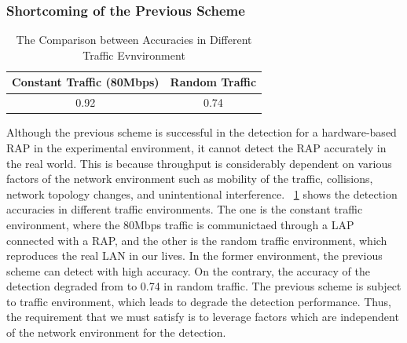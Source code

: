 \documentclass[conference]{IEEEtran}
\begin{document}
\subsubsection{Shortcoming of the Previous Scheme}\label{sec:shortcoming}
\begin{table}[t] 
    \begin{center}
        \caption{The Comparison between Accuracies in Different Traffic Evnvironment}
        \label{tab:thrput result}
        \begin{tabular}{c c} \hline
            Constant Traffic (80Mbps) & Random Traffic \\ \hline \hline
            0.92 & 0.74 \\ \hline
        \end{tabular}
    \end{center}
    \vspace{-2zh}
\end{table}
Although the previous scheme is successful in the detection for a hardware-based RAP in the experimental environment, it cannot detect the RAP accurately in the real world.
This is because throughput is considerably dependent on various factors of the network environment such as mobility of the traffic, collisions, network topology changes, and unintentional interference.
\tablename~\ref{tab:thrput result} shows the detection accuracies in different traffic environments.
The one is the constant traffic environment, where the 80Mbps traffic is communictaed through a LAP connected with a RAP, and the other is the random traffic environment, which reproduces the real LAN in our lives.
In the former environment, the previous scheme can detect with high accuracy.
On the contrary, the accuracy of the detection degraded from to 0.74 in random traffic.
The previous scheme is subject to traffic environment, which leads to degrade the detection performance.
Thus, the requirement that we must satisfy is to leverage factors which are independent of the network environment for the detection.
\end{document}
